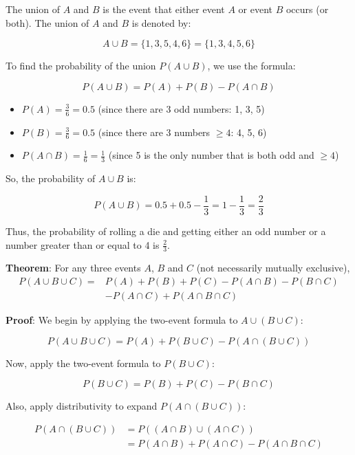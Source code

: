 \documentclass[twoside]{book}
\begin{document}
The union of \( A \) and \( B \) is the event that either event \( A \) or event \( B \) occurs (or both). The union of \( A \) and \( B \) is denoted by:

\[
A \cup B = \{1, 3, 5, 4, 6\} = \{1, 3, 4, 5, 6\}
\]

To find the probability of the union \( P(A \cup B) \), we use the formula:

\[
P(A \cup B) = P(A) + P(B) - P(A \cap B)
\]

\begin{itemize}
    \item \( P(A) = \frac{3}{6} = 0.5 \) (since there are 3 odd numbers: 1, 3, 5)
    \item \( P(B) = \frac{3}{6} = 0.5 \) (since there are 3 numbers \( \geq 4 \): 4, 5, 6)
    \item \( P(A \cap B) = \frac{1}{6} = \frac{1}{3} \) (since 5 is the only number that is both odd and \( \geq 4 \))
\end{itemize}

So, the probability of \( A \cup B \) is:

\[
P(A \cup B) = 0.5 + 0.5 - \frac{1}{3} = 1 - \frac{1}{3} = \frac{2}{3}
\]

Thus, the probability of rolling a die and getting either an odd number or a number greater than or equal to 4 is \( \frac{2}{3} \).


\begin{textbox}
\textbf{Theorem}: For any three events $A$, $B$ and $C$ (not necessarily mutually exclusive), 
\begin{align*}
    P(A \cup B \cup C) = &P(A) + P(B) +P(C) - P(A \cap B) - P(B \cap C) \\
    &- P(A \cap C)  + P(A \cap B \cap C)
\end{align*}
\end{textbox}

\textbf{Proof}: We begin by applying the two-event formula to $A \cup (B \cup C)$:

$$P(A \cup B \cup C) = P(A) + P(B \cup C) - P(A \cap (B \cup C))$$

Now, apply the two-event formula to $P(B \cup C)$:

$$P(B \cup C) = P(B) + P(C) - P(B \cap C)$$

Also, apply distributivity to expand \( P(A \cap (B \cup C)) \):

\begin{align*}
P(A \cap (B \cup C)) &= P((A \cap B) \cup (A \cap C)) \\
&= P(A \cap B) + P(A \cap C) - P(A \cap B \cap C)
\end{align*}
\end{document}
